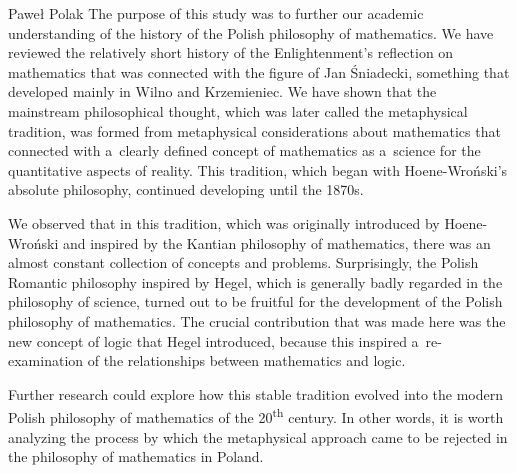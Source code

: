 \begin{artengenv}{Paweł Polak}
The purpose of this study was to further our academic understanding of the history of the Polish philosophy of mathematics. We have reviewed the relatively short history of the Enlightenment's reflection on mathematics that was connected with the figure of Jan Śniadecki, something that developed mainly in Wilno and Krzemieniec. We have shown that the mainstream philosophical thought, which was later called the metaphysical tradition, was formed from metaphysical considerations about mathematics that connected with a~clearly defined concept of mathematics as a~science for the quantitative aspects of reality. This tradition, which began with Hoene-Wroński's absolute philosophy, continued developing until the 1870s.

We observed that in this tradition, which was originally introduced by Hoene-Wroński and inspired by the Kantian philosophy of mathematics, there was an almost constant collection of concepts and problems. Surprisingly, the Polish Romantic philosophy inspired by Hegel, which is generally badly regarded in the philosophy of science, turned out to be fruitful for the development of the Polish philosophy of mathematics. The crucial contribution that was made here was the new concept of logic that Hegel introduced, because this inspired a~re-examination of the relationships between mathematics and logic.

Further research could explore how this stable tradition evolved into the modern Polish philosophy of mathematics of the 20\textsuperscript{th} century. In other words, it is worth analyzing the process by which the metaphysical approach came to be rejected in the philosophy of mathematics in Poland.

\end{artengenv}

